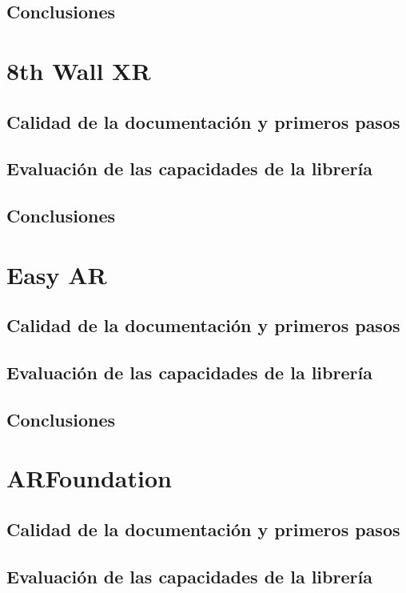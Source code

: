 \subsection{Conclusiones}


\section{8th Wall XR}
\subsection{Calidad de la documentación y primeros pasos}

\subsection{Evaluación de las capacidades de la librería}

\subsection{Conclusiones}


\section{Easy AR}
\subsection{Calidad de la documentación y primeros pasos}

\subsection{Evaluación de las capacidades de la librería}

\subsection{Conclusiones}


\section{ARFoundation}
\subsection{Calidad de la documentación y primeros pasos}

\subsection{Evaluación de las capacidades de la librería}

